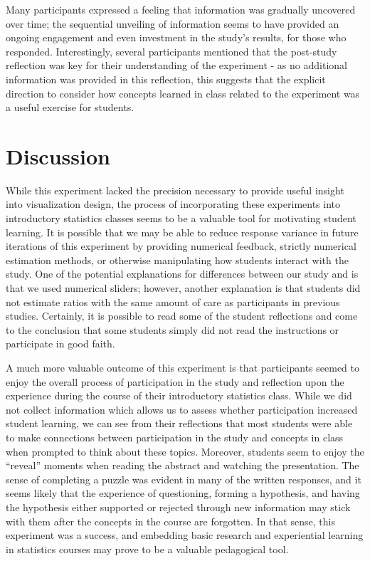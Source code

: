 \documentclass[runningheads
]{llncs}
\begin{document}
Many participants expressed a feeling that information was gradually
uncovered over time; the sequential unveiling of information seems to
have provided an ongoing engagement and even investment in the study's
results, for those who responded. Interestingly, several participants
mentioned that the post-study reflection was key for their understanding
of the experiment - as no additional information was provided in this
reflection, this suggests that the explicit direction to consider how
concepts learned in class related to the experiment was a useful
exercise for students.

\section{Discussion}\label{discussion}

While this experiment lacked the precision necessary to provide useful
insight into visualization design, the process of incorporating these
experiments into introductory statistics classes seems to be a valuable
tool for motivating student learning. It is possible that we may be able
to reduce response variance in future iterations of this experiment by
providing numerical feedback, strictly numerical estimation methods, or
otherwise manipulating how students interact with the study. One of the
potential explanations for differences between our study and
\textcite{clevelandGraphicalPerceptionTheory1984} is that we used
numerical sliders; however, another explanation is that students did not
estimate ratios with the same amount of care as participants in previous
studies. Certainly, it is possible to read some of the student
reflections and come to the conclusion that some students simply did not
read the instructions or participate in good faith.

A much more valuable outcome of this experiment is that participants
seemed to enjoy the overall process of participation in the study and
reflection upon the experience during the course of their introductory
statistics class. While we did not collect information which allows us
to assess whether participation increased student learning, we can see
from their reflections that most students were able to make connections
between participation in the study and concepts in class when prompted
to think about these topics. Moreover, students seem to enjoy the
``reveal'' moments when reading the abstract and watching the
presentation. The sense of completing a puzzle was evident in many of
the written responses, and it seems likely that the experience of
questioning, forming a hypothesis, and having the hypothesis either
supported or rejected through new information may stick with them after
the concepts in the course are forgotten. In that sense, this experiment
was a success, and embedding basic research and experiential learning in
statistics courses may prove to be a valuable pedagogical tool.


\printbibliography[title=References]
\end{document}
